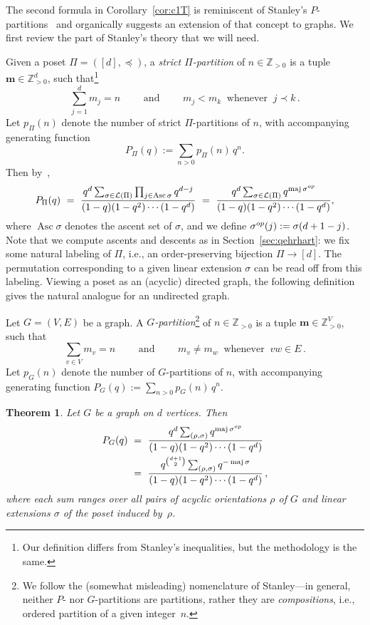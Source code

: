 \documentclass[11pt]{amsart}
\newtheorem{theorem}{Theorem} %
\newcommand\Asc{\operatorname{Asc}}
\newcommand\maj{\operatorname{maj}}
\newcommand\ZZ{\mathbb{Z}}
\newcommand\bm{\mathbf{m}}
\newcommand\op{^{\rm op}}
\begin{document}
The second formula in Corollary~\ref{cor:c1T} is reminiscent of Stanley's
$P$-partitions~\cite{stanleythesis} and organically suggests an extension of that concept to graphs.
We first review the part of Stanley's theory that we will need.

Given a poset $\Pi=([d],\preceq)$, a \emph{strict $\Pi$-partition} of $n \in
\ZZ_{ >0 }$ is a tuple $\bm \in \ZZ_{ >0 }^d$, such that\footnote{
Our definition differs from Stanley's inequalities, but the methodology is the same.
}
\[
  \sum_{ j=1 }^d m_j = n
  \qquad \text{ and } \qquad
  m_j < m_k \ \text{ whenever } \ j \prec k \, .
\]
Let $p_\Pi(n)$ denote the number of strict $\Pi$-partitions of $n$, with accompanying
generating function \[P_\Pi(q) := \sum_{ n > 0 } p_\Pi(n) \, q^n.\]
Then by~\cite[Exercise~6.23]{CRT}, 
\begin{equation}\label{eq:ppartgenfct}
  P_\Pi(q)
  \ = \ \frac{ q^d \sum_{ \sigma \in \mathcal{L}(\Pi) } \prod_{ j \in \Asc \sigma } q^{ d-j } }{ (1-q) (1-q^2) \cdots (1-q^d) } 
  \ = \ \frac{ q^d \sum_{ \sigma \in \mathcal{L}(\Pi) } q^{ \maj \sigma\op } }{ (1-q) (1-q^2) \cdots (1-q^d) }, 
\end{equation}
where $\Asc \sigma$ denotes the ascent set of $\sigma$, and we define $\sigma\op(j) := \sigma(d+1-j)$.
Note that we compute ascents and descents as in Section~\ref{sec:qehrhart}:
we fix some natural labeling of $\Pi$, i.e., an order-preserving bijection $\Pi \to [d]$.
The permutation corresponding to a given linear extension $\sigma$ can be read off from this labeling.
Viewing a poset as an (acyclic) directed graph, the following definition gives the natural
analogue for an undirected graph.


Let $G = (V, E)$ be a graph.
A \emph{$G$-partition}\footnote{
We follow the (somewhat misleading) nomenclature of Stanley---in general, neither $P$- nor
$G$-partitions are partitions, rather they are \emph{compositions}, i.e., ordered partition
of a given integer~$n$.
} 
of $n \in \ZZ_{ >0 }$ is a tuple $\bm \in \ZZ_{ >0 }^V$, such that
\[
  \sum_{ v \in V } m_v = n
  \qquad \text{ and } \qquad
  m_v \ne m_w \ \text{ whenever } \ vw \in E \, .
\]
Let $p_G(n)$ denote the number of $G$-partitions of $n$, with accompanying
generating function $P_G(q) := \sum_{ n > 0 } p_G(n) \, q^n$.

\begin{theorem}
Let $G$ be a graph on $d$ vertices. Then
\begin{align*}
  P_G(q)
  \ &= \ \frac{ q^d \sum_{(\rho,\sigma)} q^{ \maj \sigma\op } }{ (1-q) (1-q^2) \cdots (1-q^d) } \\
    &= \ \frac{ q^{ \binom{ d+1 } 2 } \sum_{(\rho,\sigma)} q^{ - \maj \sigma } }{ (1-q) (1-q^2) \cdots (1-q^d) } \, ,
\end{align*}
where each sum ranges over all pairs of acyclic orientations $\rho$ of $G$ and linear extensions $\sigma$ of the poset induced by~$\rho$.
\end{theorem}
\end{document}
